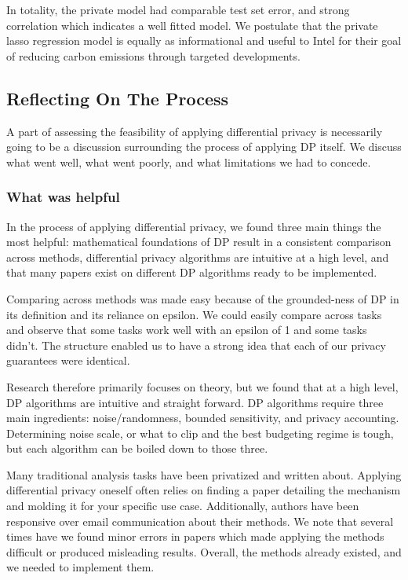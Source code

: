 \documentclass[12pt,letterpaper]{article}
\begin{document}
In totality, the private model had comparable test set error, and strong correlation which indicates a well fitted model. We postulate that the private lasso regression model is equally as informational and useful to Intel for their goal of reducing carbon emissions through targeted developments.


\subsection{Reflecting On The Process}
A part of assessing the feasibility of applying differential privacy is necessarily going to be a discussion surrounding the process of applying DP itself. We discuss what went well, what went poorly, and what limitations we had to concede.

\subsubsection{What was helpful}
In the process of applying differential privacy, we found three main things the most helpful: mathematical foundations of DP result in a consistent comparison across methods, differential privacy algorithms are intuitive at a high level, and that many papers exist on different DP algorithms ready to be implemented.

Comparing across methods was made easy because of the grounded-ness of DP in its definition and its reliance on epsilon. We could easily compare across tasks and observe that some tasks work well with an epsilon of 1 and some tasks didn't. The structure enabled us to have a strong idea that each of our privacy guarantees were identical.

Research therefore primarily focuses on theory, but we found that at a high level, DP algorithms are intuitive and straight forward. DP algorithms require three main ingredients: noise/randomness, bounded sensitivity, and privacy accounting. Determining noise scale, or what to clip and the best budgeting regime is tough, but each algorithm can be boiled down to those three.

Many traditional analysis tasks have been privatized and written about. Applying differential privacy oneself often relies on finding a paper detailing the mechanism and molding it for your specific use case. Additionally, authors have been responsive over email communication about their methods. We note that several times have we found minor errors in papers which made applying the methods difficult or produced misleading results. Overall, the methods already existed, and we needed to implement them.  
\end{document}

